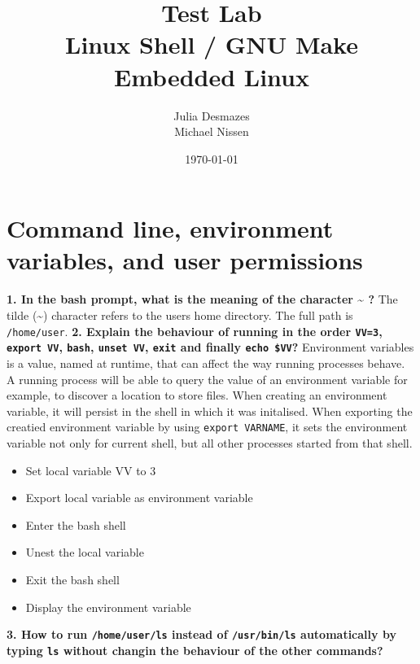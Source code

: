\documentclass[a4paper,oneside,onecolumn]{article}
\newcommand{\code}[1]{\colorbox{codegray}{\texttt{#1}}}
\begin{document}
\title{Test Lab \\ Linux Shell / GNU Make \\ Embedded Linux}
\author{Julia Desmazes \\ Michael Nissen}
\date{\today}
\maketitle
\bigskip

\section*{Command line, environment variables, and user permissions}

\noindent 
\textbf{1. In the bash prompt, what is the meaning of the character \~{} ?}
\newline
\newline
The tilde (\~{}) character refers to the users home directory. The full path is \texttt{/home/user}.
\newline
\newline
\noindent
\textbf{2. Explain the behaviour of running in the order \code{VV=3}, \code{export VV}, \code{bash}, \code{unset VV}, \code{exit} and finally \code{echo \$VV}?}
\newline
\newline
Environment variables is a value, named at runtime, that can affect the way running processes behave. A running process will be able to query the value of an environment variable for example, to discover a location to store files. When creating an environment variable, it will persist in the shell in which it was initalised.
\newline
When exporting the creatied environment variable by using \code{export VARNAME}, it sets the environment variable not only for current shell, but all other processes started from that shell.
\begin{itemize}
	\item Set local variable VV to 3
	\item Export local variable as environment variable
	\item Enter the bash shell
	\item Unest the local variable
	\item Exit the bash shell
	\item Display the environment variable
\end{itemize}
\noindent
\textbf{3. How to run \texttt{/home/user/ls} instead of \texttt{/usr/bin/ls} automatically by typing \code{ls} without changin the behaviour of the other commands?}
\end{document}

